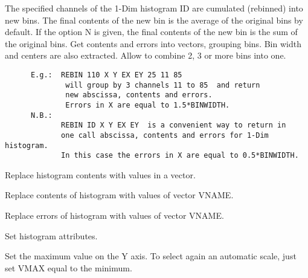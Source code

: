    \par
The specified channels of the 1-Dim histogram ID are cumulated (rebinned) 
   into new bins. The final contents of the new bin is the average of the 
   original bins by default. If the option N is given, the final contents of 
   the new bin is the sum of the original bins.  Get contents and errors into 
   vectors, grouping bins.  Bin width and centers are also extracted.  Allow 
   to combine 2, 3 or more bins into one.  
\begin{verbatim}
      E.g.:  REBIN 110 X Y EX EY 25 11 85
              will group by 3 channels 11 to 85  and return
              new abscissa, contents and errors.
              Errors in X are equal to 1.5*BINWIDTH.
      N.B.:
             REBIN ID X Y EX EY  is a convenient way to return in
             one call abscissa, contents and errors for 1-Dim histogram.
             In this case the errors in X are equal to 0.5*BINWIDTH.
\end{verbatim}

\ENDCMD
{}
\ifMENUtext
   \par
Replace histogram contents with values in a vector.  


\fi


\BEGARG
{}
\ENDARG

   \par
Replace contents of histogram with values of vector VNAME.  

\ENDCMD


\BEGARG
{}
\ENDARG

   \par
Replace errors of histogram with values of vector VNAME.  

\ENDCMD
{}
\ifMENUtext
   \par
Set histogram attributes.  


\fi


\BEGARG
{}
\ENDARG

   \par
Set the maximum value on the Y axis.  To select again an automatic scale, 
   just set VMAX equal to the minimum.  

